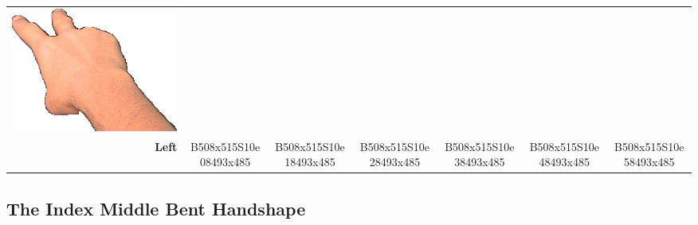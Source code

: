 \documentclass{article}
\begin{document}
\begin{center}
\begin{tabular}{r*{6}{c}}
\includegraphics[scale=0.1]{images/02-01-6.jpg}\\
\textbf{Left}&
B508x515S10e08493x485&
B508x515S10e18493x485&
B508x515S10e28493x485&
B508x515S10e38493x485&
B508x515S10e48493x485&
B508x515S10e58493x485\\
\end{tabular}
\end{center}

\subsection{The Index Middle Bent Handshape}
\end{document}
